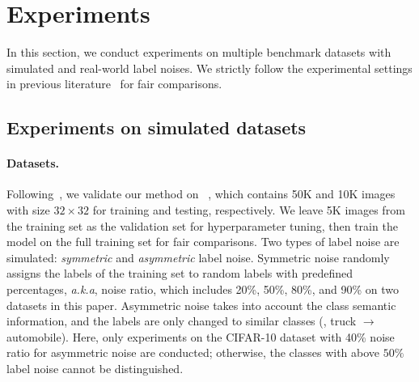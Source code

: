 \section{Experiments}
\label{sec:exp}
In this section, we conduct experiments on multiple benchmark datasets with simulated and real-world label noises. We strictly follow the experimental settings in previous literature~\cite{ortego2021multi,li2020dividemix,li2021learning,liu2020early} for fair comparisons.

\subsection{Experiments on simulated datasets}

\paragraph{Datasets.} 
Following~\cite{ortego2021multi,li2020dividemix,li2021learning,liu2020early}, we validate our method on ~\cite{krizhevsky2009learning}, which contains 50K and 10K images with size $32\times 32$ for training and testing, respectively. We leave 5K images from the training set as the validation set for hyperparameter tuning, then train the model on the full training set for fair comparisons.
Two types of label noise are simulated: \emph{symmetric} and \emph{asymmetric} label noise. Symmetric noise randomly assigns the labels of the training set to random labels with predefined percentages, \textit{a.k.a}, noise ratio, which includes 20\%, 50\%, 80\%, and 90\% on two datasets in this paper. Asymmetric noise takes into account the class semantic information, and the labels are only changed to similar classes (\eg, truck $\to$ automobile). Here, only experiments on the CIFAR-10 dataset with 40\% noise ratio for asymmetric noise are conducted; otherwise, the classes with above $50\%$ label noise cannot be distinguished.

